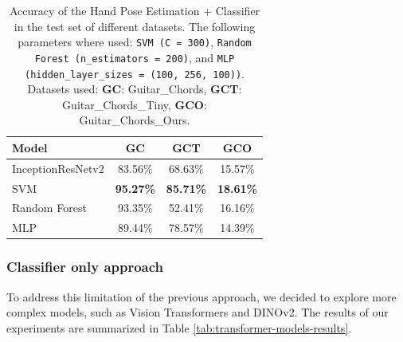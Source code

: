 \documentclass[10pt,twocolumn,letterpaper]{article}
\begin{document}
\begin{table}[h]
    \centering
    \begin{tabular}{lccc}
        \toprule
        \textbf{Model}    & \textbf{GC}      & \textbf{GCT}     & \textbf{GCO}     \\
        \midrule
        InceptionResNetv2 & 83.56\%          & 68.63\%          & 15.57\%          \\
        \midrule
        SVM               & \textbf{95.27\%} & \textbf{85.71\%} & \textbf{18.61\%} \\
        Random Forest     & 93.35\%          & 52.41\%          & 16.16\%          \\
        MLP               & 89.44\%          & 78.57\%          & 14.39\%          \\
        \bottomrule
    \end{tabular}
    \caption{Accuracy of the Hand Pose Estimation + Classifier in the test set of different datasets. The following parameters where used: \texttt{SVM (C = 300)}, \texttt{Random Forest (n\_estimators = 200)}, and \texttt{MLP (hidden\_layer\_sizes = (100, 256, 100))}. Datasets used: \textbf{GC}: Guitar\_Chords, \textbf{GCT}: Guitar\_Chords\_Tiny, \textbf{GCO}: Guitar\_Chords\_Ours.}
    \label{tab:handpose-classifier-results}
\end{table}

\subsubsection{Classifier only approach}
To address this limitation of the previous approach, we decided to explore more complex models, such as Vision Transformers and DINOv2. The results of our experiments are summarized in Table \ref{tab:transformer-models-results}.
\end{document}
